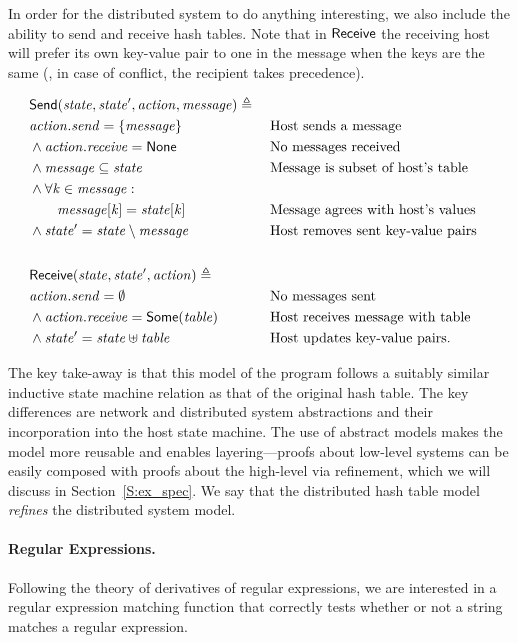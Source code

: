 In order for the distributed system to do anything interesting, we also include
the ability to send and receive hash tables. Note that in \(\mathsf{Receive}\) the
receiving host will prefer its own key-value pair to one in the message when the
keys are the same (\ie, in case of conflict, the recipient takes precedence).

\begin{alignat*}{2}
    & \mathsf{Send}(\mathit{state}, \mathit{state'}, \mathit{action}, \mathit{message}) \triangleq\; \\
    & \mathit{action.send} = \left\{\mathit{message}\right\} && \text{Host sends a message} \\
    & \land \mathit{action.receive} = \mathsf{None} && \text{No messages received} \\
    & \land \mathit{message} \subseteq \mathit{state} && \text{Message is subset of host's table} \\
    & \land \forall \mathit{k} \in \mathit{message} : \\
    & \qquad \mathit{message}[\mathit{k}] = \mathit{state}[\mathit{k}]
        && \text{Message agrees with host's values} \\
    & \land \mathit{state'} = \mathit{state} \setminus \mathit{message}
        && \text{Host removes sent key-value pairs}\\
    \\
    & \mathsf{Receive}(\mathit{state}, \mathit{state'}, \mathit{action}) \triangleq\; \\
    & \mathit{action.send} = \emptyset && \text{No messages sent} \\
    & \land \mathit{action.receive} = \mathsf{Some}(\mathit{table})
        && \text{Host receives message with table} \\
    & \land \mathit{state'} = \mathit{state} \uplus \mathit{table}
        && \text{Host updates key-value pairs.}
\end{alignat*}

The key take-away is that this model of the program follows a suitably similar
inductive state machine relation as that of the original hash table. The key
differences are network and distributed system abstractions and their
incorporation into the host state machine. The use of abstract models makes the
model more reusable and enables layering---proofs about low-level systems can be
easily composed with proofs about the high-level via refinement, which we will
discuss in Section~\ref{S:ex_spec}. We say that the distributed hash table model
\emph{refines} the distributed system model.

\paragraph{Regular Expressions.} Following the theory of derivatives of regular
expressions, we are interested in a regular expression matching function that
correctly tests whether or not a string matches a regular expression.

